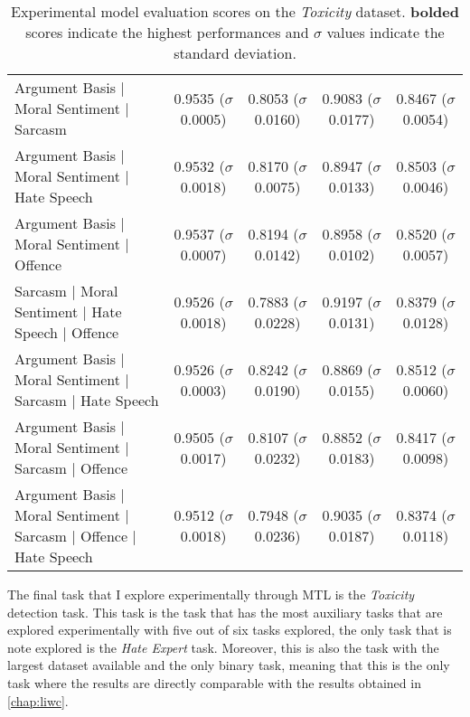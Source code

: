 {\begin{landscape}
\begin{table}[]
{\begin{tabular}{l|cccc}
    Argument Basis | Moral Sentiment | Sarcasm                          & 0.9535 ($\sigma$ 0.0005)          & 0.8053 ($\sigma$ 0.0160)          & 0.9083 ($\sigma$ 0.0177)          & 0.8467 ($\sigma$ 0.0054)          \\
    Argument Basis | Moral Sentiment | Hate Speech                      & 0.9532 ($\sigma$ 0.0018)          & 0.8170 ($\sigma$ 0.0075)          & 0.8947 ($\sigma$ 0.0133)          & 0.8503 ($\sigma$ 0.0046)          \\
    Argument Basis | Moral Sentiment | Offence                          & 0.9537 ($\sigma$ 0.0007)          & 0.8194 ($\sigma$ 0.0142)          & 0.8958 ($\sigma$ 0.0102)          & 0.8520 ($\sigma$ 0.0057)          \\
    Sarcasm | Moral Sentiment | Hate Speech | Offence                   & 0.9526 ($\sigma$ 0.0018)          & 0.7883 ($\sigma$ 0.0228)          & 0.9197 ($\sigma$ 0.0131)          & 0.8379 ($\sigma$ 0.0128)          \\
    Argument Basis | Moral Sentiment | Sarcasm | Hate Speech            & 0.9526 ($\sigma$ 0.0003)          & 0.8242 ($\sigma$ 0.0190)          & 0.8869 ($\sigma$ 0.0155)          & 0.8512 ($\sigma$ 0.0060)          \\
    Argument Basis | Moral Sentiment | Sarcasm | Offence                & 0.9505 ($\sigma$ 0.0017)          & 0.8107 ($\sigma$ 0.0232)          & 0.8852 ($\sigma$ 0.0183)          & 0.8417 ($\sigma$ 0.0098)          \\
    Argument Basis | Moral Sentiment | Sarcasm | Offence | Hate Speech  & 0.9512 ($\sigma$ 0.0018)          & 0.7948 ($\sigma$ 0.0236)          & 0.9035 ($\sigma$ 0.0187)          & 0.8374 ($\sigma$ 0.0118)
  \end{tabular}%
  }
  \caption{Experimental model evaluation scores on the \textit{Toxicity} dataset. \textbf{bolded} scores indicate the highest performances and $\sigma$ values indicate the standard deviation.}
  \label{tab:mtl_test_wulczyn}
\end{table}
\end{landscape}
}

The final task that I explore experimentally through MTL is the \textit{Toxicity} detection task.
This task is the task that has the most auxiliary tasks that are explored experimentally with five out of six tasks explored, the only task that is note explored is the \textit{Hate Expert} task.
Moreover, this is also the task with the largest dataset available and the only binary task, meaning that this is the only task where the results are directly comparable with the results obtained in \cref{chap:liwc}.

